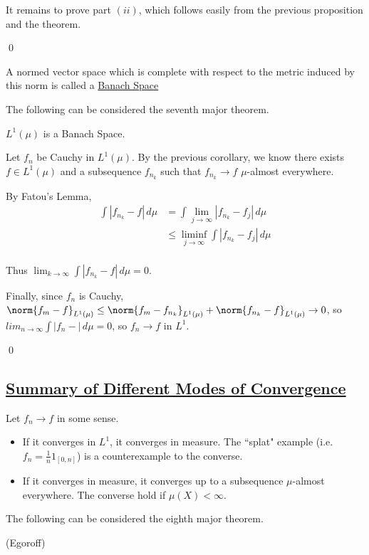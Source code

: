 \documentclass[x11names,reqno,14pt]{extarticle}
\newcommand*{\oo}{\infty}
\begin{document}
It remains to prove part $(ii)$, which follows easily from the previous proposition and the theorem. 

\qed


A normed vector space which is complete with respect to the metric induced by this norm is called a \underline{Banach Space}

The following can be considered the seventh major theorem. 

\cor

$L^1(\mu)$ is a Banach Space. 

\proof

Let $f_n$ be Cauchy in $L^1(\mu)$. By the previous corollary, we know there exists $f\in L^1(\mu)$ and a subsequence $f_{n_k}$ such that $f_{n_k}\to f$ $\mu$-almost everywhere. 

By Fatou's Lemma, 
\begin{align*}
\int|f_{n_k} - f|\,d\mu & = \int\lim_{j\to\oo}|f_{n_k} - f_j|\,d\mu \\
& \leq \liminf_{j\to\oo}\int|f_{n_k} - f_j|\,d\mu \\
\end{align*}

Thus $\lim_{k\to\oo}\int|f_{n_k} - f|\,d\mu = 0$.

Finally, since $f_n$ is Cauchy, $\norm{f_m - f}_{L^1(\mu)} \leq \norm{f_m - f_{n_k}}_{L^1(\mu)} + \norm{f_{n_k} - f}_{L^1(\mu)} \to 0$, so $lim_{n\to\oo}\int|f_n - |\,d\mu = 0$, so $f_n \to f$ in $L^1$. 

\qed

\subsection*{\underline{Summary of Different Modes of Convergence}}

Let $f_n \to f$ in some sense. 
\begin{itemize}
\item If it converges in $L^1$, it converges in measure. The ``splat" example (i.e. $f_n = \frac{1}{n}1_{[0, n]}$) is a counterexample to the converse. 
\item If it converges in measure, it converges up to a subsequence $\mu$-almost everywhere. The converse hold if $\mu(X)<\oo$.
\end{itemize}

The following can be considered the eighth major theorem.

\thm (Egoroff)
\end{document}
